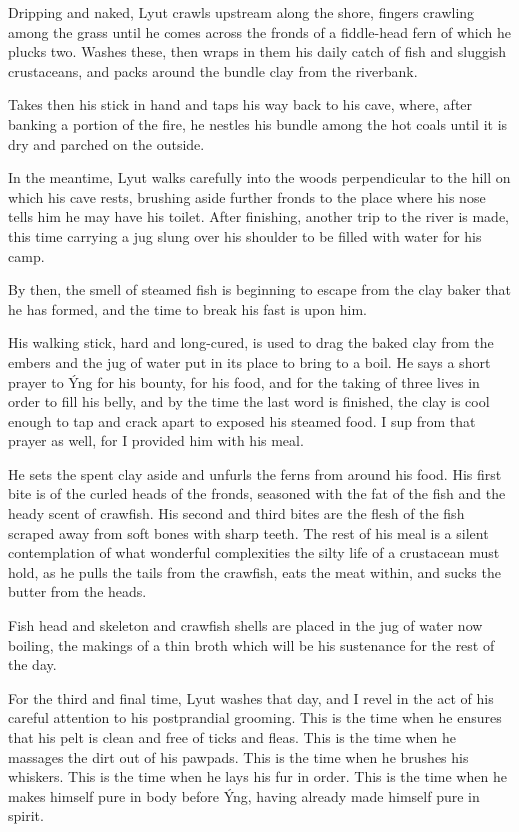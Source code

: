Dripping and naked, Lyut crawls upstream along the shore, fingers crawling among the grass until he comes across the fronds of a fiddle-head fern of which he plucks two. Washes these, then wraps in them his daily catch of fish and sluggish crustaceans, and packs around the bundle clay from the riverbank.

Takes then his stick in hand and taps his way back to his cave, where, after banking a portion of the fire, he nestles his bundle among the hot coals until it is dry and parched on the outside.

In the meantime, Lyut walks carefully into the woods perpendicular to the hill on which his cave rests, brushing aside further fronds to the place where his nose tells him he may have his toilet. After finishing, another trip to the river is made, this time carrying a jug slung over his shoulder to be filled with water for his camp.

By then, the smell of steamed fish is beginning to escape from the clay baker that he has formed, and the time to break his fast is upon him.

His walking stick, hard and long-cured, is used to drag the baked clay from the embers and the jug of water put in its place to bring to a boil. He says a short prayer to Ýng for his bounty, for his food, and for the taking of three lives in order to fill his belly, and by the time the last word is finished, the clay is cool enough to tap and crack apart to exposed his steamed food. I sup from that prayer as well, for I provided him with his meal.

He sets the spent clay aside and unfurls the ferns from around his food. His first bite is of the curled heads of the fronds, seasoned with the fat of the fish and the heady scent of crawfish. His second and third bites are the flesh of the fish scraped away from soft bones with sharp teeth. The rest of his meal is a silent contemplation of what wonderful complexities the silty life of a crustacean must hold, as he pulls the tails from the crawfish, eats the meat within, and sucks the butter from the heads.

Fish head and skeleton and crawfish shells are placed in the jug of water now boiling, the makings of a thin broth which will be his sustenance for the rest of the day.

For the third and final time, Lyut washes that day, and I revel in the act of his careful attention to his postprandial grooming. This is the time when he ensures that his pelt is clean and free of ticks and fleas. This is the time when he massages the dirt out of his pawpads. This is the time when he brushes his whiskers. This is the time when he lays his fur in order. This is the time when he makes himself pure in body before Ýng, having already made himself pure in spirit.

